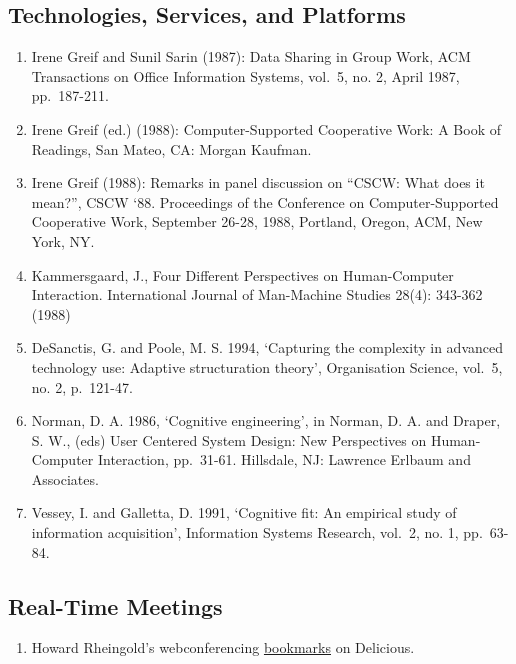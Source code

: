 \hypertarget{technologies-services-and-platforms}{%
\subsection{Technologies, Services, and
Platforms}\label{technologies-services-and-platforms}}

\begin{enumerate}
\def\labelenumi{\arabic{enumi}.}
\item
  Irene Greif and Sunil Sarin (1987): Data Sharing in Group Work, ACM
  Transactions on Office Information Systems, vol.~5, no. 2, April 1987,
  pp.~187-211.
\item
  Irene Greif (ed.) (1988): Computer-Supported Cooperative Work: A Book
  of Readings, San Mateo, CA: Morgan Kaufman.
\item
  Irene Greif (1988): Remarks in panel discussion on ``CSCW: What does
  it mean?'', CSCW `88. Proceedings of the Conference on
  Computer-Supported Cooperative Work, September 26-28, 1988, Portland,
  Oregon, ACM, New York, NY.
\item
  Kammersgaard, J., Four Different Perspectives on Human-Computer
  Interaction. International Journal of Man-Machine Studies 28(4):
  343-362 (1988)
\item
  DeSanctis, G. and Poole, M. S. 1994, `Capturing the complexity in
  advanced technology use: Adaptive structuration theory', Organisation
  Science, vol.~5, no. 2, p.~121-47.
\item
  Norman, D. A. 1986, `Cognitive engineering', in Norman, D. A. and
  Draper, S. W., (eds) User Centered System Design: New Perspectives on
  Human-Computer Interaction, pp.~31-61. Hillsdale, NJ: Lawrence Erlbaum
  and Associates.
\item
  Vessey, I. and Galletta, D. 1991, `Cognitive fit: An empirical study
  of information acquisition', Information Systems Research, vol.~2, no.
  1, pp.~63-84.
\end{enumerate}

\hypertarget{real-time-meetings}{%
\subsection{Real-Time Meetings}\label{real-time-meetings}}

\begin{enumerate}
\def\labelenumi{\arabic{enumi}.}
\tightlist
\item
  Howard Rheingold's webconferencing
  \href{http://delicious.com/hrheingold/webconferencing}{bookmarks} on
  Delicious.
\end{enumerate}

